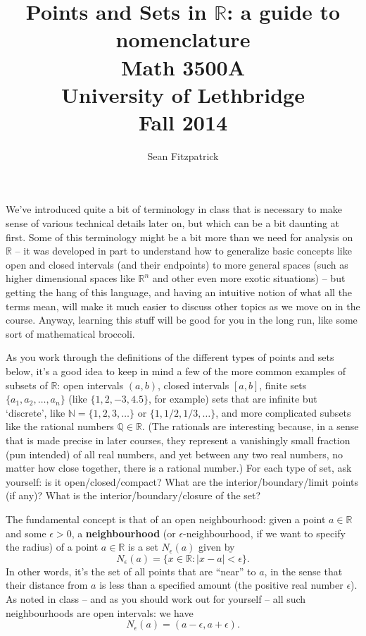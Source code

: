 \documentclass[12pt,letterpaper]{article}
\title{Points and Sets in $\mathbb{R}$: a guide to nomenclature\\Math 3500A\\University of Lethbridge\\Fall 2014}
\author{Sean Fitzpatrick}
\newcommand{\abs}[1]{\lvert #1\rvert}
\newcommand{\R}{\mathbb{R}}
\begin{document}
\maketitle

We've introduced quite a bit of terminology in class that is necessary to make sense of various technical details later on, but which can be a bit daunting at first. Some of this terminology might be a bit more than we need for analysis on $\mathbb{R}$ -- it was developed in part to understand how to generalize basic concepts like open and closed intervals (and their endpoints) to more general spaces (such as higher dimensional spaces like $\mathbb{R}^n$ and other even more exotic situations) -- but getting the hang of this language, and having an intuitive notion of what all the terms mean, will make it much easier to discuss other topics as we move on in the course. Anyway, learning this stuff will be good for you in the long run, like some sort of mathematical broccoli.

As you work through the definitions of the different types of points and sets below, it's a good idea to keep in mind a few of the more common examples of subsets of $\R$: open intervals $(a,b)$, closed intervals $[a,b]$, finite sets $\{a_1,a_2,\ldots, a_n\}$ (like $\{1,2,-3,4.5\}$, for example) sets that are infinite but `discrete', like $\mathbb{N} = \{1,2,3,\ldots\}$ or $\{1,1/2,1/3,\ldots\}$, and more complicated subsets like the rational numbers $\mathbb{Q}\in\R$. (The rationals are interesting because, in a sense that is made precise in later courses, they represent a vanishingly small fraction (pun intended) of all real numbers, and yet between any two real numbers, no matter how close together, there is a rational number.) For each type of set, ask yourself: is it open/closed/compact? What are the interior/boundary/limit points (if any)? What is the interior/boundary/closure of the set?

The fundamental concept is that of an open neighbourhood: given a point $a\in \R$ and some $\epsilon>0$, a {\bf neighbourhood} (or $\epsilon$-neighbourhood, if we want to specify the radius) of a point $a\in\R$ is a set $N_\epsilon(a)$ given by
\[
N_\epsilon(a) = \{x\in\R : \abs{x-a}<\epsilon\}.
\]
In other words, it's the set of all points that are ``near'' to $a$, in the sense that their distance from $a$ is less than a specified amount (the positive real number $\epsilon$). As noted in class -- and as you should work out for yourself -- all such neighbourhoods are open intervals: we have
\[
N_\epsilon(a) = (a-\epsilon,a+\epsilon).
\]
\end{document}
